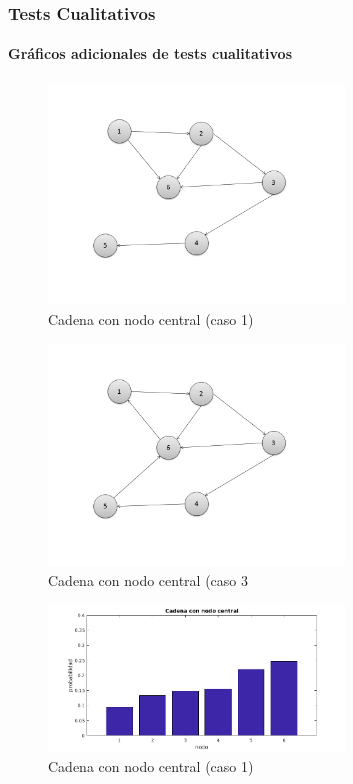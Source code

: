 \subsubsection*{Tests Cualitativos}

\paragraph{Gráficos adicionales de tests cualitativos}


\begin{figure}
  \centering
    \includegraphics[width=0.7\textwidth]{img/Cadena6v1.png}
  \caption{Cadena con nodo central (caso 1)}
  \label{fig: Cadena con nodo central (caso 1)}
\end{figure}


\begin{figure}
  \centering
    \includegraphics[width=0.7\textwidth]{img/Cadena6v3.png}
  \caption{Cadena con nodo central (caso 3}
  \label{fig: Cadena con nodo central, con ciclo}
\end{figure}


\begin{figure}
  \centering
    \includegraphics[width=0.7\textwidth]{img/cadena6v1.png}
  \caption{Cadena con nodo central (caso 1)}
  \label{fig: Cadena con nodo central (caso 1)}
\end{figure}


